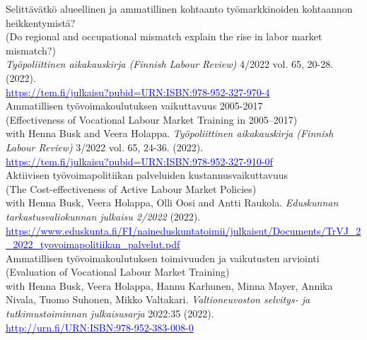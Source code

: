 \documentclass[16pt]{article}
\begin{document}
\noindent Selittävätkö alueellinen ja ammatillinen kohtaanto työmarkkinoiden kohtaannon heikkentymistä?\\
\noindent (Do regional and occupational mismatch explain the rise in labor market mismatch?) \\
\noindent \textit{Työpoliittinen aikakauskirja (Finnish Labour Review)} 4/2022 vol. 65, 20-28.  (2022). \\
\noindent \href{https://tem.fi/julkaisu?pubid=URN:ISBN:978-952-327-970-4}{\textcolor{blue}{https://tem.fi/julkaisu?pubid=URN:ISBN:978-952-327-970-4}} \\

\noindent Ammatillisen työvoimakoulutuksen vaikuttavuus 2005-2017 \\
\noindent (Effectiveness of Vocational Labour Market Training in 2005–2017) \\
\noindent  with Henna Busk and Veera Holappa. \textit{Työpoliittinen aikakauskirja (Finnish Labour Review)} 3/2022 vol. 65, 24-36.  (2022).  \\
\noindent \href{https://tem.fi/julkaisu?pubid=URN:ISBN:978-952-327-910-0}{\textcolor{blue}{https://tem.fi/julkaisu?pubid=URN:ISBN:978-952-327-910-0f}} \\

\noindent Aktiivisen työvoimapolitiikan palveluiden kustannusvaikuttavuus \\
\noindent (The Cost-effectiveness of Active Labour Market Policies) \\
\noindent with Henna Busk, Veera Holappa, Olli Oosi and Antti Raukola. \textit{Eduskunnan tarkastusvaliokunnan julkaisu 2/2022} (2022). \\
\noindent  \href{https://www.eduskunta.fi/FI/naineduskuntatoimii/julkaisut/Documents/TrVJ\_2\_2022\_tyovoimapolitiikan\_palvelut.pdf}{\textcolor{blue}{https://www.eduskunta.fi/FI/naineduskuntatoimii/julkaisut/Documents/TrVJ\_2\_2022\_tyovoimapolitiikan\_palvelut.pdf}} \\

\noindent Ammatillisen ty\"{o}voimakoulutuksen toimivuuden ja vaikutusten arviointi \\
\noindent (Evaluation of Vocational Labour Market Training) \\
\noindent with Henna Busk, Veera Holappa, Hannu Karhunen, Minna Mayer, Annika Nivala, Tuomo Suhonen, Mikko Valtakari.  \textit{Valtioneuvoston selvitys- ja tutkimustoiminnan julkaisusarja} 2022:35 (2022).  \\
\noindent \href{http://urn.fi/URN:ISBN:978-952-383-008-0}{\textcolor{blue}{http://urn.fi/URN:ISBN:978-952-383-008-0}} \\
\end{document}
